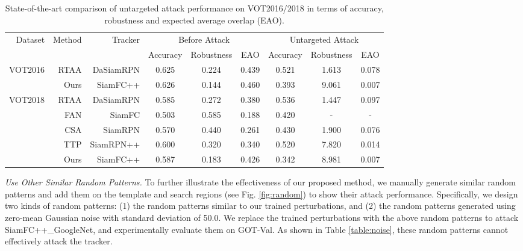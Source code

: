 \documentclass[journal]{IEEEtran}
\renewcommand{\uline}{}
\begin{document}
\begin{table}[t]
  \centering
  \caption{State-of-the-art comparison of untargeted attack performance on VOT2016/2018 in terms of accuracy, robustness and expected average overlap (EAO).}
  \begin{tabular}{rrrcccccc}
  \toprule
  \multirow{2}{*}[-2pt]{Dataset} & \multirow{2}{*}[-2pt]{Method} & \multirow{2}{*}[-2pt]{Tracker} & \multicolumn{3}{c}{Before Attack} & \multicolumn{3}{c}{Untargeted Attack} \\ \cmidrule{4-9}
                           &                         &                          & Accuracy   & Robustness  & EAO    & Accuracy    & Robustness    & EAO     \\ \midrule
  \multirow{2}{*}{VOT2016} & RTAA                    & DaSiamRPN                & 0.625      & 0.224       & 0.439  & 0.521       & 1.613         & 0.078   \\
                           & Ours                    & SiamFC++                 & 0.626      & 0.144       & 0.460  & 0.393       & 9.061         & 0.007   \\ \midrule
  \multirow{5}{*}{VOT2018} & RTAA                    & DaSiamRPN                & 0.585      & 0.272       & 0.380  & 0.536       & 1.447         & 0.097   \\
                           & FAN                     & SiamFC                   & 0.503      & 0.585       & 0.188  & 0.420       & -             & -       \\
                           & CSA                     & SiamRPN                  & 0.570      & 0.440       & 0.261  & 0.430       & 1.900         & 0.076   \\
                           & TTP                     & SiamRPN++                & 0.600      & 0.320       & 0.340  & 0.520       & 7.820         & 0.014   \\
                           & Ours                    & SiamFC++                 & 0.587      & 0.183       & 0.426  & 0.342       & 8.981         & 0.007   \\ \bottomrule
  \end{tabular}
  \label{tab:sota_vot}
\end{table}

\textit{Use Other Similar Random Patterns.} To further illustrate the effectiveness of our proposed method, we manually generate similar random patterns and add them on the template and search regions (see Fig. \ref{fig:random}) to show their attack performance. Specifically, we design two kinds of random patterns: (1) the random \uline{patterns} similar to our trained perturbations, and (2) the random \uline{patterns} generated using zero-mean Gaussian noise with standard deviation \uline{of} 50.0. We replace the trained perturbations with the above random patterns to attack SiamFC++\_GoogleNet, and experimentally evaluate them on GOT-Val. As shown in Table \ref{table:noise}, these random patterns cannot effectively attack the tracker.
\end{document}
